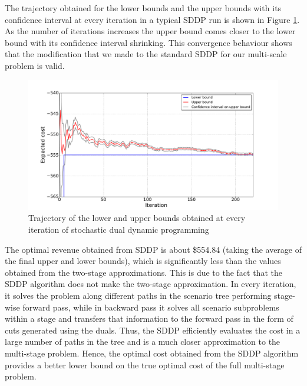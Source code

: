 \documentclass[11pt,twoside]{article}
\begin{document}
The trajectory obtained for the lower bounds and the upper bounds with its confidence interval at every iteration in a typical SDDP run is shown in Figure \ref{fig:bounds}. As the number of iterations increases the upper bound comes closer to the lower bound with its confidence interval shrinking. This convergence behaviour shows that the modification that we made to the standard SDDP for our multi-scale problem is valid. 
\begin{figure}[h!]
\begin{center}
\includegraphics[scale=0.4]
{Figures/Plots/dualdynamic/bounds.pdf} \caption{Trajectory of the lower and upper bounds obtained at every iteration of stochastic dual dynamic programming}\label{fig:bounds}
\end{center}
\end{figure}
\FloatBarrier
The optimal revenue obtained from SDDP is about \$554.84 (taking the average of the final upper and lower bounds), which is significantly less than the values obtained from the two-stage approximations. This is due to the fact that the SDDP algorithm does not make the two-stage approximation. In every iteration, it solves the problem along different paths in the scenario tree performing stage-wise forward pass, while in backward pass it solves all scenario subproblems within a stage and transfers that information to the forward pass in the form of cuts generated using the duals. Thus, the SDDP efficiently evaluates the cost in a large number of paths in the tree and is a much closer approximation to the multi-stage problem. Hence, the optimal cost obtained from the SDDP algorithm provides a better lower bound on the true optimal cost of the full multi-stage problem.
\FloatBarrier
\end{document}
